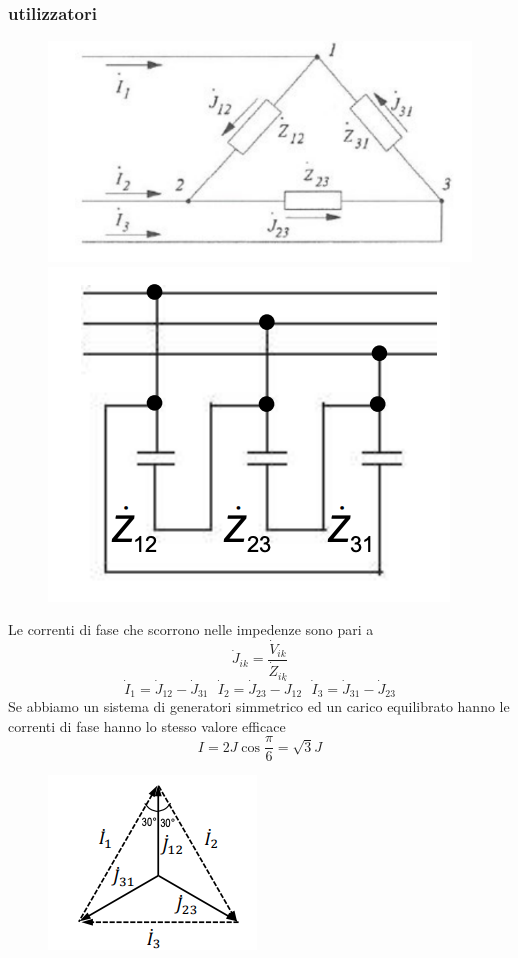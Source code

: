\documentclass{article}
\theoremstyle{definition}
\begin{document}
\subsubsection{utilizzatori}
\begin{figure}[h]
    \centering
    \includegraphics[scale=0.30]{immagini/t1.png}
    \hfil
    \includegraphics[scale=0.30]{immagini/t2.png}
\end{figure}
Le correnti di fase che scorrono nelle impedenze sono pari a 
$$\dot{J}_{ik}=\frac{\dot{V}_{ik}}{\dot{Z}_{ik}}$$
$$\dot{I}_1=\dot{J}_{12}-\dot{J}_{31} \ \ \ \dot{I}_2=\dot{J}_{23}-\dot{J}_{12} \ \ \ \dot{I}_3=\dot{J}_{31}-\dot{J}_{23}$$
Se abbiamo un sistema di generatori simmetrico ed un carico equilibrato hanno le correnti di fase hanno lo stesso valore efficace 
$$I=2J\cos{\frac{\pi}{6}}=\sqrt{3}J$$
\begin{figure}[h]
    \centering
    \includegraphics[scale=0.45]{immagini/1234.png}
  
    \label{fig:enter-label}
\end{figure}
\end{document}
